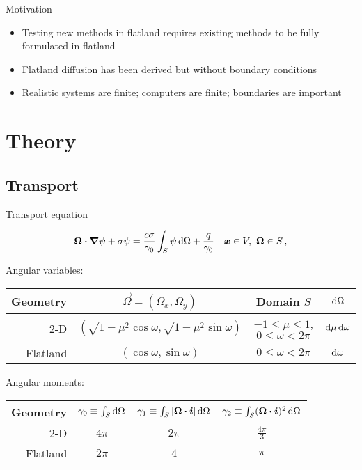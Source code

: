 \documentclass{beamer}
\begin{document}
\begin{frame}{Motivation}
  \begin{itemize}
    \item Testing new methods in flatland requires existing methods to be fully
      formulated in flatland
    \item Flatland diffusion has been derived \cite{Asa2008} but without
      boundary conditions
    \item Realistic systems are finite; computers are finite; boundaries are
      important
  \end{itemize}
\end{frame}

\section{Theory}
\subsection{Transport}
\begin{frame}{Transport equation}

\begin{equation}\label{eq:generalTransport}
  \bm{\Omega}\bm{\cdot} \bm{\nabla} \psi + \sigma \psi
  = \frac{c \sigma}{\gamma_0} \int_{S} \psi \mathop{}\!\mathrm{d}\Omega + \frac{q}{\gamma_0}
  \quad \bm{x}\in V,\ \bm{\Omega}\in S \,,
\end{equation}

  \vspace{2ex}

  \small
  \centering
  Angular variables:
  \begin{tabular}{rccc}
\toprule
   Geometry & $\vec{\Omega}=(\Omega_x, \Omega_y)$ & Domain $S$ & $\mathop{}\!\mathrm{d}\Omega$
\\ \midrule
2-D & $( \sqrt{1-\mu^2} \cos \omega,
   \sqrt{1-\mu^2} \sin \omega)$
   & $-1 \le \mu \le 1$, $0 \le \omega < 2\pi$ & $\mathop{}\!\mathrm{d}\mu \mathop{}\!\mathrm{d} \omega$
   \\
   Flatland & $ ( \cos \omega, \sin \omega )$
   & $0 \le \omega < 2\pi$ & $\mathop{}\!\mathrm{d} \omega$
\\ \bottomrule
  \end{tabular}

  \vspace{2ex}

Angular moments:
  \centering
  \begin{tabular}{rccc}
\toprule
   Geometry
   & $\gamma_0 \equiv \int_S \mathop{}\!\mathrm{d}\Omega$
   & $\gamma_1 \equiv \int_S \left| \bm{\Omega}\bm{\cdot}\bm{i} \right| \mathop{}\!\mathrm{d}\Omega$
   & $\gamma_2 \equiv \int_S (\bm{\Omega}\bm{\cdot}\bm{i})^2 \mathop{}\!\mathrm{d}\Omega$
\\ \midrule
   2-D & $4\pi$ & $2\pi$ & $\frac{4\pi}{3}$
   \\
   Flatland & $2\pi$ & $4$ & $\pi$
\\ \bottomrule
  \end{tabular}

\end{frame}
\end{document}
